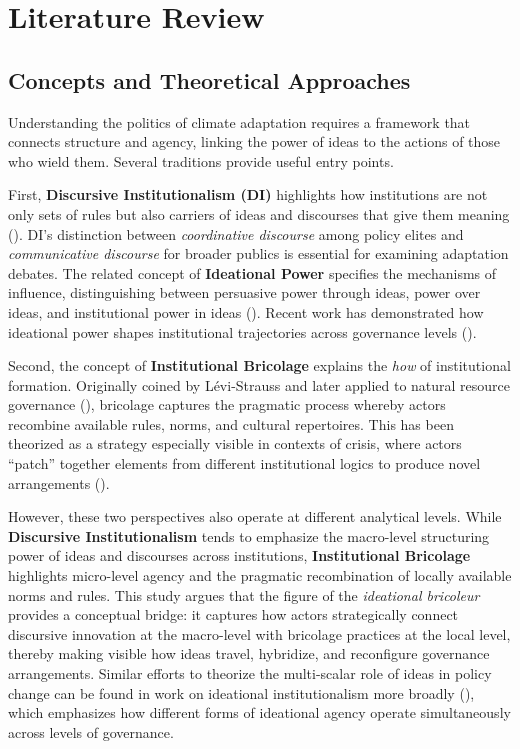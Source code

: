 \section*{Literature Review}

\subsection*{Concepts and Theoretical Approaches}

Understanding the politics of climate adaptation requires a framework that connects 
structure and agency, linking the power of ideas to the actions of those who wield them. 
Several traditions provide useful entry points.

First, \textbf{Discursive Institutionalism (DI)} highlights how institutions are not only 
sets of rules but also carriers of ideas and discourses that give them meaning 
(\citealp{Schmidt2008}). DI’s distinction between \textit{coordinative discourse} among 
policy elites and \textit{communicative discourse} for broader publics is essential for 
examining adaptation debates. The related concept of \textbf{Ideational Power} specifies 
the mechanisms of influence, distinguishing between persuasive power through ideas, 
power over ideas, and institutional power in ideas (\citealp{CarstensenSchmidt2016}). 
Recent work has demonstrated how ideational power shapes institutional trajectories 
across governance levels (\citealp{Kleinschmit2024}).

Second, the concept of \textbf{Institutional Bricolage} explains the \textit{how} of 
institutional formation. Originally coined by Lévi-Strauss and later applied to 
natural resource governance (\citealp{Cleaver2001}), bricolage captures the pragmatic 
process whereby actors recombine available rules, norms, and cultural repertoires. 
This has been theorized as a strategy especially visible in contexts of crisis, where 
actors “patch” together elements from different institutional logics to produce novel 
arrangements (\citealp{Carstensen2017}).

However, these two perspectives also operate at different analytical levels. 
While \textbf{Discursive Institutionalism} tends to emphasize the macro-level 
structuring power of ideas and discourses across institutions, 
\textbf{Institutional Bricolage} highlights micro-level agency and the pragmatic 
recombination of locally available norms and rules. This study argues that the 
figure of the \textit{ideational bricoleur} provides a conceptual bridge: it 
captures how actors strategically connect discursive innovation at the macro-level 
with bricolage practices at the local level, thereby making visible how ideas travel, 
hybridize, and reconfigure governance arrangements. Similar efforts to theorize the 
multi-scalar role of ideas in policy change can be found in work on ideational 
institutionalism more broadly (\citealp{BelandCox2011}), which emphasizes how 
different forms of ideational agency operate simultaneously across levels of 
governance.


